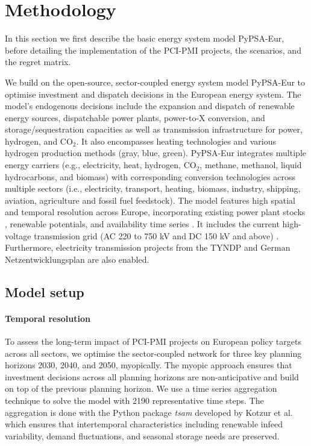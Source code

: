 \documentclass[pdflatex,sn-nature]{sn-jnl}%
\theoremstyle{thmstyleone}%
\theoremstyle{thmstyletwo}%
\theoremstyle{thmstylethree}%
\begin{document}
\section{Methodology}\label{sec:methodology}
In this section we first describe the basic energy system model PyPSA-Eur, before detailing the implementation of the PCI-PMI projects, the scenarios, and the regret matrix.

We build on the open-source, sector-coupled energy system model PyPSA-Eur \cite{neumannPotentialRoleHydrogen2023,frysztackiComparisonClusteringMethods2022,glaumOffshorePowerHydrogen2024,horschPyPSAEurOpenOptimisation2018} to optimise investment and dispatch decisions in the European energy system. The model's endogenous decisions include the expansion and dispatch of renewable energy sources, dispatchable power plants, power-to-X conversion, and storage/sequestration capacities as well as transmission infrastructure for power, hydrogen, and CO$_2$. It also encompasses heating technologies and various hydrogen production methods (gray, blue, green).
PyPSA-Eur integrates multiple energy carriers (e.g., electricity, heat, hydrogen, CO$_2$, methane, methanol, liquid hydrocarbons, and biomass) with corresponding conversion technologies across multiple sectors (i.e., electricity, transport, heating, biomass, industry, shipping, aviation, agriculture and fossil fuel feedstock). The model features high spatial and temporal resolution across Europe, incorporating existing power plant stocks \cite{gotzensPerformingEnergyModelling2019}, renewable potentials, and availability time series \cite{hofmannAtliteLightweightPython2021}. It includes the current high-voltage transmission grid (AC 220 to 750 kV and DC 150 kV and above) \cite{xiongModellingHighvoltageGrid2025}. Furthermore, electricity transmission projects from the TYNDP \cite{entso-eTenYearNetworkDevelopment2020} and German Netzentwicklungsplan \cite{bnetzaBestaetigungNetzentwicklungsplanStrom2024} are also enabled.

\subsection{Model setup}\label{sec:model_setup}

\paragraph{Temporal resolution}\label{sec:temporal_resolution}
To assess the long-term impact of PCI-PMI projects on European policy targets across all sectors, we optimise the sector-coupled network for three key planning horizons 2030, 2040, and 2050, myopically. The myopic approach ensures that investment decisions across all planning horizons are non-anticipative and build on top of the previous planning horizon. We use a time series aggregation technique to solve the model with 2190 representative time steps. The aggregation is done with the Python package \textit{tsam} developed by Kotzur et al. \cite{kotzurImpactDifferentTime2018} which ensures that intertemporal characteristics including renewable infeed variability, demand fluctuations, and seasonal storage needs are preserved.
\end{document}
